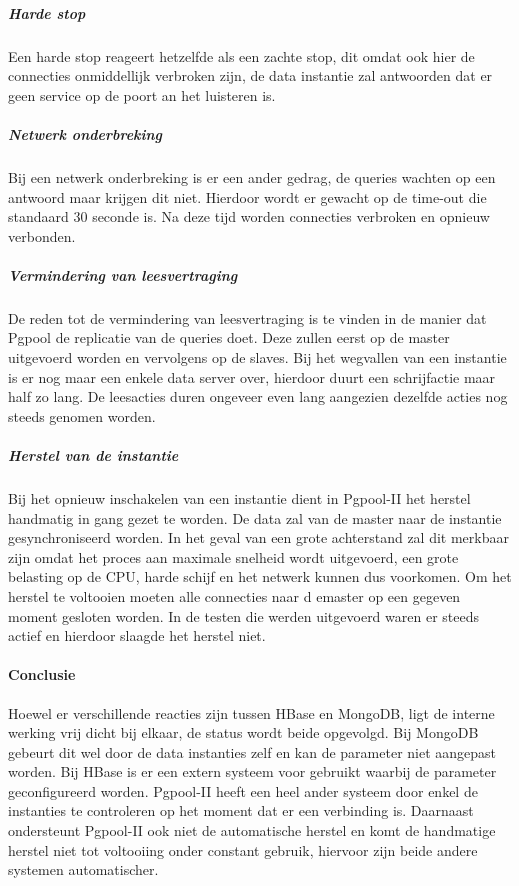 \subparagraph{Harde stop} Een harde stop reageert hetzelfde als een zachte stop, dit omdat ook hier de connecties onmiddellijk verbroken zijn, de data instantie zal antwoorden dat er geen service op de poort an het luisteren is. 

\subparagraph{Netwerk onderbreking} Bij een netwerk onderbreking is er een ander gedrag, de queries wachten op een antwoord maar krijgen dit niet. Hierdoor wordt er gewacht op de time-out die standaard 30 seconde is. Na deze tijd worden connecties verbroken en opnieuw verbonden. \\

\subparagraph{Vermindering van leesvertraging} De reden tot de vermindering van leesvertraging is te vinden in de manier dat Pgpool de replicatie van de queries doet. Deze zullen eerst op de master uitgevoerd worden en vervolgens op de slaves. Bij het wegvallen van een instantie is er nog maar een enkele data server over, hierdoor duurt een schrijfactie maar half zo lang. De leesacties duren ongeveer even lang aangezien dezelfde acties nog steeds genomen worden. 

\subparagraph{Herstel van de instantie} Bij het opnieuw inschakelen van een instantie dient in Pgpool-II het herstel handmatig in gang gezet te worden. De data zal van de master naar de instantie gesynchroniseerd worden. In het geval van een grote achterstand zal dit merkbaar zijn omdat het proces aan maximale snelheid wordt uitgevoerd, een grote belasting op de CPU, harde schijf en het netwerk kunnen dus voorkomen. Om het herstel te voltooien moeten alle connecties naar d emaster op een gegeven moment gesloten worden. In de testen die werden uitgevoerd waren er steeds actief en hierdoor slaagde het herstel niet. 

\paragraph{Conclusie} Hoewel er verschillende reacties zijn tussen HBase en MongoDB, ligt de interne werking vrij dicht bij elkaar, de status wordt beide opgevolgd. Bij MongoDB gebeurt dit wel door de data instanties zelf en kan de parameter niet aangepast worden. Bij HBase is er een extern systeem voor gebruikt waarbij de parameter geconfigureerd worden. Pgpool-II heeft een heel ander systeem door enkel de instanties te controleren op het moment dat er een verbinding is. 
Daarnaast ondersteunt Pgpool-II ook niet de automatische herstel en komt de handmatige herstel niet tot voltooiing onder constant gebruik, hiervoor zijn beide andere systemen automatischer. 

